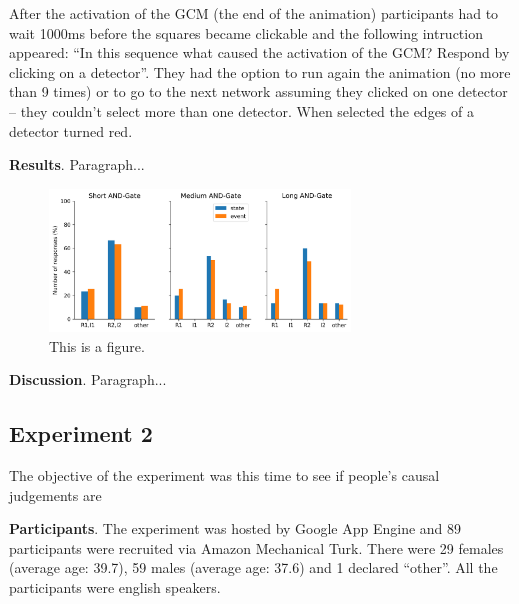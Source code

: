 \documentclass[10pt,letterpaper]{article}
\begin{document}
After the activation of the GCM (the end of the animation) participants had to wait 1000ms before the squares became clickable and the following intruction appeared: ``In this sequence what caused the activation of the GCM? Respond by clicking on a detector''. They had the option to run again the animation (no more than 9 times) or to go to the next network assuming they clicked on one detector -- they couldn't select more than one detector. When selected the edges of a detector turned red.

\textbf{Results}. Paragraph...

\begin{figure}[ht]
\begin{center}
\includegraphics[width=8cm]{results_E1}
\end{center}
\caption{This is a figure.} 
\label{fig:2}
\end{figure}

\textbf{Discussion}. Paragraph...

\subsection{Experiment 2}

The objective of the experiment was this time to see if people's causal judgements are 

\textbf{Participants}. The experiment was hosted by Google App Engine and 89 participants were recruited via Amazon Mechanical Turk. There were 29 females (average age: 39.7), 59 males (average age: 37.6) and 1 declared ``other''. All the participants were english speakers.
\end{document}
